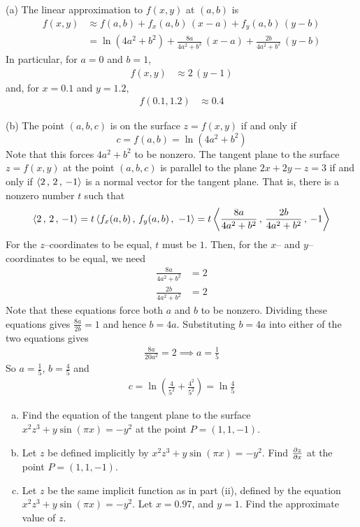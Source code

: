 \begin{solution}
(a) The linear approximation to $f(x,y)$ at $(a,b)$ is
\begin{align*}
f(x,y) &\approx f(a,b)  + f_x(a,b)\,(x-a) + f_y(a,b)\,(y-b) \\
       &= \ln(4a^2 + b^2) + \frac{8a}{4a^2+b^2}\, (x-a)
                              + \frac{2b}{4a^2+b^2}\, (y-b)
\end{align*}
In particular, for $a=0$ and $b=1$,
\begin{align*}
f(x,y) &\approx  2\, (y-1)
\end{align*}
and, for $x=0.1$ and $y=1.2$,
\begin{align*}
f(0.1,1.2) &\approx  0.4
\end{align*}

(b)
The point $(a,b,c)$ is on the surface $z=f(x,y)$ if and only if
\begin{equation*}
c = f(a,b) = \ln(4a^2 + b^2) 
\end{equation*}
Note that this forces $4a^2 + b^2$ to be nonzero.
The tangent plane to the surface $z = f (x, y)$ at the point $(a,b,c)$ 
is parallel to the plane $2x + 2y - z = 3$ if and only if 
$\left< 2\,,\,2\,,\,-1\right>$ is a normal vector for the tangent plane.
That is, there is a nonzero number $t$ such that
\begin{align*}
\left< 2\,,\,2\,,\,-1\right>
=t\left< f_x(a,b)\,,\,f_y(a,b)\,,\ -1\right>
=t\left< \frac{8a}{4a^2+b^2} \,,\, \frac{2b}{4a^2+b^2} \,,\,-1\right>
\end{align*}
For the $z$--coordinates to be equal, $t$ must be $1$.
Then, for the $x$-- and $y$--coordinates to be equal, we need
\begin{align*}
\frac{8a}{4a^2+b^2} &= 2 \\
\frac{2b}{4a^2+b^2} &= 2
\end{align*}
Note that these equations force both $a$ and $b$ to be nonzero.
Dividing these equations gives $\frac{8a}{2b}=1$ and hence $b=4a$.
Substituting $b=4a$ into either of the two equations gives
\begin{align*}
\frac{8a}{20a^2}=2 \implies a=\frac{1}{5}
\end{align*}
So $a=\frac{1}{5}$, $b=\frac{4}{5}$ and 
\begin{align*}
c=\ln\left(\frac{4}{5^2}+\frac{4^2}{5^2}\right)
 =\ln\frac{4}{5}
\end{align*}
\end{solution}

\begin{question}[M200 2013D] %
\begin{enumerate}[(a)]
\item 
Find the equation of the tangent plane to the surface 
$x^2 z^3 + y \sin(\pi x) = -y^2$ at the point $P = (1,1,-1)$.
\item
Let $z$ be defined implicitly by $x^2 z^3 + y \sin(\pi x) = -y^2$. 
Find $\pdiff{z}{x}$ at the point  $P = (1,1,-1)$.
\item
Let $z$ be the same implicit function as in part (ii), defined by 
the equation $x^2 z^3 + y \sin(\pi x) = -y^2$. Let $x = 0.97$, and $y = 1$. 
Find the approximate value of $z$.
\end{enumerate}
\end{question}

